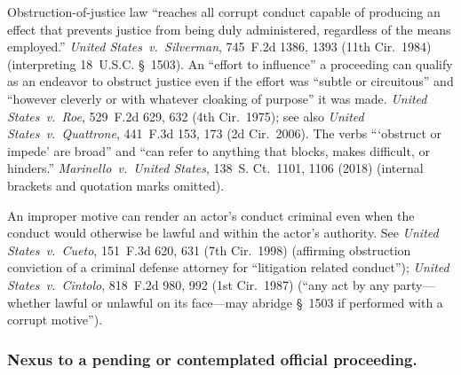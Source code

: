 Obstruction-of-justice law ``reaches all corrupt conduct capable of producing an effect that prevents justice from being duly administered, regardless of the means employed.''
\textit{United States~v.\ Silverman}, 745~F.2d 1386, 1393 (11th Cir.~1984) (interpreting 18~U.S.C. \S~1503).
An ``effort to influence'' a proceeding can qualify as an endeavor to obstruct justice even if the effort was ``subtle or circuitous'' and ``however cleverly or with whatever cloaking of purpose'' it was made.
\textit{United States~v.\ Roe}, 529~F.2d 629, 632 (4th Cir.~1975);
see also \textit{United States~v.\ Quattrone}, 441~F.3d 153, 173 (2d Cir.~2006).
The verbs ``\thinspace`obstruct or impede' are broad'' and ``can refer to anything that blocks, makes difficult, or hinders.''
\textit{Marinello~v.\ United States}, 138~S. Ct.~1101, 1106 (2018) (internal brackets and quotation marks omitted).

An improper motive can render an actor's conduct criminal even when the conduct would otherwise be lawful and within the actor's authority.
See \textit{United States~v.\ Cueto}, 151~F.3d 620, 631 (7th Cir.~1998) (affirming obstruction conviction of a criminal defense attorney for ``litigation related conduct''); \textit{United States~v.\ Cintolo}, 818~F.2d 980, 992 (1st Cir.~1987) (``any act by any party---whether lawful or unlawful on its face---may abridge \S~1503 if performed with a corrupt motive'').

\subsubsection*{Nexus to a pending or contemplated official proceeding.}

